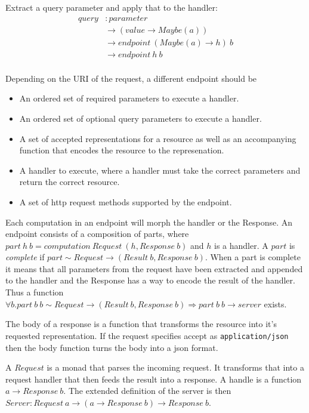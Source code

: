 Extract a query parameter and apply that to the handler: 
\begin{equation}
\begin{split}
    query &: parameter\\
          &\rightarrow (value\rightarrow Maybe(a))\\
          & \rightarrow endpoint\ (Maybe(a)\rightarrow h)\ b \\
          &\rightarrow endpoint\ h\ b \\ 
\end{split}
\end{equation}

Depending on the URI of the request, a different endpoint should be 

\begin{itemize}
\item An ordered set of required parameters to execute a handler.
\item An ordered set of optional query parameters to execute a handler.
\item A set of accepted representations for a resource as well as an
accompanying function that encodes the resource to the represenation.
\item A handler to execute, where a handler must take the correct parameters and
return the correct resource.
\item A set of http request methods supported by the endpoint.
\end{itemize}


Each computation in an endpoint will morph the handler or the Response. An
endpoint consists of a composition of parts, where $part\ h\ b = computation\
Request\ (h,Response\ b)$ and $h$ is a handler. A $part$ is \textit{complete} if
$part\sim Request \rightarrow (Result\ b, Response\ b)$.  When a part is
complete it means that all parameters from the request have been extracted and
appended to the handler and the Response has a way to encode the result of the
handler. Thus a function $\forall b. part\ b \ b\sim Request \rightarrow (Result\
b, Response\ b)\Rightarrow part\ b\ b \rightarrow server$ exists.


The body of a response is a function that transforms the resource into it's
requested representation. If the request specifies accept as
\lstinline{application/json} then the body function turns the body into a json
format. 

A $Request$ is a monad that parses the incoming request. It transforms that
into a request handler that then feeds the result into a response. A handle is a
function $a\rightarrow Response\ b$. The extended definition of the server
is then $Server : Request\ a \rightarrow (a \rightarrow Response\ b) \rightarrow
Response\ b$.

